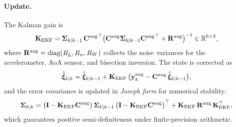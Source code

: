 \documentclass[11pt,a4paper]{article}
\newcommand{\vxi}{\bm{\xi}}
\begin{document}
\paragraph{Update.}
The Kalman gain is
\begin{equation}
  \mathbf{K}_{\rm EKF}
  = \boldsymbol{\Sigma}_{k|k-1}\,{\mathbf{C}^{\rm aug}}^\top
    \bigl(\mathbf{C}^{\rm aug}\boldsymbol{\Sigma}_{k|k-1}{\mathbf{C}^{\rm aug}}^\top
          + \mathbf{R}^{\rm aug}\bigr)^{-1}
  \in \mathbb{R}^{6\times3},
  \label{eq:kalman_gain_ekf}
\end{equation}
where $\mathbf{R}^{\rm aug} = \operatorname{diag}(R_{\ddot{h}}, R_\alpha, R_W)$
collects the noise variances for the accelerometer, AoA sensor, and bisection
inversion.
The state is corrected as
\begin{equation}
  \hat{\tilde{\vxi}}_{k|k}
  = \hat{\tilde{\vxi}}_{k|k-1}
  + \mathbf{K}_{\rm EKF}\,
    \bigl(\mathbf{y}^{\rm aug}_k
          - \mathbf{C}^{\rm aug}\,\hat{\tilde{\vxi}}_{k|k-1}\bigr),
  \label{eq:ekf_update}
\end{equation}
and the error covariance is updated in \emph{Joseph form} for numerical stability:
\begin{equation}
  \boldsymbol{\Sigma}_{k|k}
  = \bigl(\mathbf{I} - \mathbf{K}_{\rm EKF}\mathbf{C}^{\rm aug}\bigr)\,
    \boldsymbol{\Sigma}_{k|k-1}\,
    \bigl(\mathbf{I} - \mathbf{K}_{\rm EKF}\mathbf{C}^{\rm aug}\bigr)^\top
  + \mathbf{K}_{\rm EKF}\,\mathbf{R}^{\rm aug}\,\mathbf{K}_{\rm EKF}^\top,
  \label{eq:joseph}
\end{equation}
which guarantees positive semi-definiteness under finite-precision arithmetic.
\end{document}
